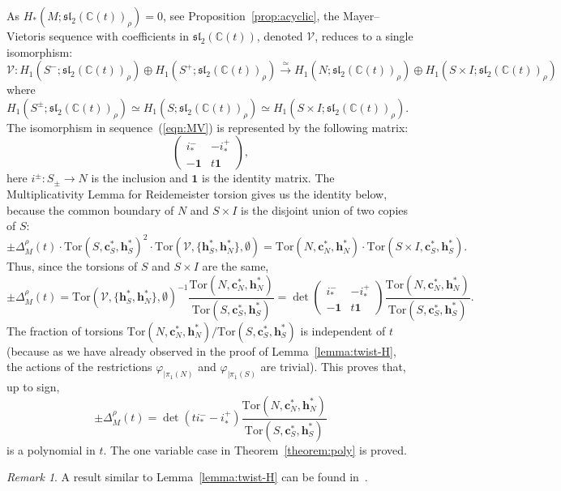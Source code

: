 \documentclass[a4paper]{amsart}
\theoremstyle{plain}
\theoremstyle{definition}
\theoremstyle{remark}
\newtheorem{remark}{Remark}%
\newcommand{\CC}{{\mathbb C}}
\newcommand{\I}{\mathbf{1}}
\newcommand{\sllt}{\mathfrak{sl}_2(\CC(t))}
\newcommand{\sllrhot}{\mathfrak{sl}_2(\CC(t))_\rho}
\newcommand{\PolyTors}[2]{\Delta_{#1}^{#2}}
\newcommand{\Tor}[3]{\mathrm{Tor} ({#1}, {#2}, {#3})}
\newcommand{\cbasis}[2][c]{\mathbf{#1}^{#2}}
\newcommand{\hbasis}[2][h]{\mathbf{#1}^{#2}}
\begin{document}
As $H_*(M; \sllrhot) = 0$, see Proposition~\ref{prop:acyclic}, the
Mayer--Vietoris sequence with coefficients in $\sllt$, denoted
$\mathcal{V}$, reduces to a single isomorphism:
\begin{equation}\label{eqn:MV}
  \mathcal{V}: 
  H_1(S^-;\sllrhot) \oplus H_1(S^+;\sllrhot) \xrightarrow{\simeq}
  H_1(N;\sllrhot) \oplus H_1(S \times I;\sllrhot) 
\end{equation}
where $H_1(S^\pm;\sllrhot) \simeq H_1(S;\sllrhot) \simeq H_1(S \times
I;\sllrhot)$.  The isomorphism in sequence~(\ref{eqn:MV}) is represented by the following matrix:
\[
\left(
  \begin{array}{cc}
    i^-_* & -i^+_* \\ 
    -\I & t\I
  \end{array}
\right),
\]
here $i^{\pm}\colon S_\pm \to N$ is the inclusion and $\I$ is the
identity matrix.  The Multiplicativity Lemma for Reidemeister
torsion gives us the identity below, because the common boundary of
$N$ and $S \times I$ is the disjoint union of two copies of $S$:
\[
\pm \PolyTors{M}{\rho}(t) \cdot \Tor{S}{\cbasis{*}_S}{\hbasis{*}_S}^2
\cdot \Tor{\mathcal{V}}{\{\hbasis{*}_S, \hbasis{*}_N\}}{\emptyset} =
\Tor{N}{\cbasis{*}_N}{\hbasis{*}_N} \cdot \Tor{S\times
  I}{\cbasis{*}_S}{\hbasis{*}_S}.
\]
Thus, since the torsions of $S$ and $S \times I$ are the same,
\[
\pm\PolyTors{M}{\rho}(t) = \Tor{\mathcal{V}}{\{\hbasis{*}_S,
  \hbasis{*}_N\}}{\emptyset}^{-1} \frac{
  \Tor{N}{\cbasis{*}_N}{\hbasis{*}_N} }{
  \Tor{S}{\cbasis{*}_S}{\hbasis{*}_S} } = \det \left(
  \begin{array}{cc}
    i^-_* & -i^+_* \\
    -\I & t\I
  \end{array}
\right) \frac{ \Tor{N}{\cbasis{*}_N}{\hbasis{*}_N} }{
  \Tor{S}{\cbasis{*}_S}{\hbasis{*}_S} }.
\]
The fraction of torsions $\Tor{N}{\cbasis{*}_N}{\hbasis{*}_N} /
\Tor{S}{\cbasis{*}_S}{\hbasis{*}_S}$ is independent of $t$ (because as
we have already observed in the proof of Lemma~\ref{lemma:twist-H},
the actions of the restrictions $\varphi_{|\pi_1(N)}$ and
$\varphi_{|\pi_1(S)}$ are trivial).  This proves that, up to sign,
$$
\pm \PolyTors{M}{\rho}(t) = \det(t i^-_* - i^+_*) \frac{
  \Tor{N}{\cbasis{*}_N}{\hbasis{*}_N} }{
  \Tor{S}{\cbasis{*}_S}{\hbasis{*}_S} }
$$ is a polynomial in $t$.
The one variable case in Theorem~\ref{theorem:poly} is proved.

\begin{remark}
  A result similar to Lemma~\ref{lemma:twist-H} can be found
  in~\cite[Proposition 3.6]{KL}.
\end{remark}
\end{document}
